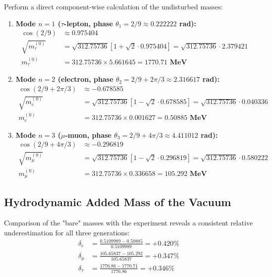 \documentclass[12pt,a4paper]{article}
\begin{document}
	Perform a direct component-wise calculation of the undisturbed masses:
	\begin{enumerate}
		\item \textbf{Mode $n=1$ ($\tau$-lepton, phase $\theta_1 = 2/9 \approx 0.222222$ rad):}
		\begin{align}
			\cos(2/9) &\approx 0.975404 \\
			\sqrt{m_\tau^{(0)}} &= \sqrt{312.75736} \left[ 1 + \sqrt{2} \cdot 0.975404 \right] = \sqrt{312.75736} \cdot 2.379421 \\
			m_\tau^{(0)} &= 312.75736 \times 5.661645 = \mathbf{1770.71 \text{ MeV}}
		\end{align}
		\item \textbf{Mode $n=2$ (electron, phase $\theta_2 = 2/9 + 2\pi/3 \approx 2.316617$ rad):}
		\begin{align}
			\cos(2/9 + 2\pi/3) &\approx -0.678585 \\
			\sqrt{m_e^{(0)}} &= \sqrt{312.75736} \left[ 1 - \sqrt{2} \cdot 0.678585 \right] = \sqrt{312.75736} \cdot 0.040336 \\
			m_e^{(0)} &= 312.75736 \times 0.001627 = \mathbf{0.50885 \text{ MeV}}
		\end{align}
		\item \textbf{Mode $n=3$ ($\mu$-muon, phase $\theta_3 = 2/9 + 4\pi/3 \approx 4.411012$ rad):}
		\begin{align}
			\cos(2/9 + 4\pi/3) &\approx -0.296819 \\
			\sqrt{m_\mu^{(0)}} &= \sqrt{312.75736} \left[ 1 - \sqrt{2} \cdot 0.296819 \right] = \sqrt{312.75736} \cdot 0.580222 \\
			m_\mu^{(0)} &= 312.75736 \times 0.336658 = \mathbf{105.292 \text{ MeV}}
		\end{align}
	\end{enumerate}
	
	\subsection{Hydrodynamic Added Mass of the Vacuum}
	Comparison of the "bare" masses with the experiment reveals a consistent relative underestimation for all three generations:
	\begin{align}
		\delta_e &= \frac{0.5109989 - 0.50885}{0.5109989} = +0.420\% \\
		\delta_\mu &= \frac{105.65837 - 105.292}{105.65837} = +0.347\% \\
		\delta_\tau &= \frac{1776.86 - 1770.71}{1776.86} = +0.346\%
	\end{align}
	
\end{document}
